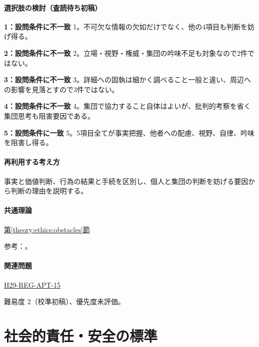 \paragraph{選択肢の検討（査読待ち初稿）}\mbox{}\par

\noindent\textbf{1：設問条件に不一致} 1。不可欠な情報の欠如だけでなく、他の4項目も判断を妨げ得る。\par

\noindent\textbf{2：設問条件に不一致} 2。立場・視野・権威・集団の吟味不足も対象なので2件ではない。\par

\noindent\textbf{3：設問条件に不一致} 3。詳細への固執は細かく調べること一般と違い、周辺への影響を見落とすので3件ではない。\par

\noindent\textbf{4：設問条件に不一致} 4。集団で協力すること自体はよいが、批判的考察を省く集団思考も阻害要因である。\par

\noindent\textbf{5：設問条件に一致} 5。5項目全てが事実把握、他者への配慮、視野、自律、吟味を阻害し得る。\par

\paragraph{再利用する考え方} 事実と価値判断、行為の結果と手続を区別し、個人と集団の判断を妨げる要因から判断の理由を説明する。

\paragraph{共通理論} \hyperref[theory:ethics:obstacles]{第\ref*{theory:ethics:obstacles}節}

\par 参考：\cite{davis_seven_steps}。

\paragraph{関連問題} \hyperref[q:h29-reg-apt-15]{H29-REG-APT-15}

\par 難易度 2（校準初稿）、優先度未評価。

\section{社会的責任・安全の標準}


